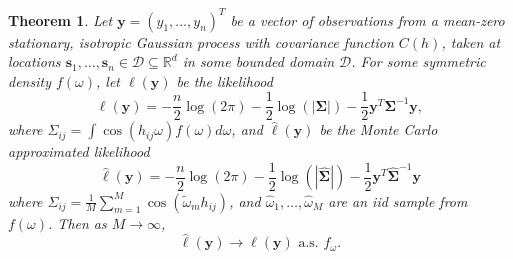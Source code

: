 \documentclass[12pt]{article}
\newtheorem{theorem}{Theorem}
\begin{document}
\begin{theorem}
  Let $\bm{y} = (y_1, \dots, y_n)^T$ be a vector of observations from a mean-zero stationary, isotropic Gaussian process with covariance function $C(h)$, taken at locations $\bm{s}_1, \dots, \bm{s}_n \in \mathcal{D} \subseteq \mathbb{R}^d$ in some bounded domain $\mathcal{D}$.  For some symmetric density $f(\omega)$, let $\ell(\bm{y})$ be the likelihood
  \[
    \ell(\bm{y}) = -\frac{n}{2} \log(2\pi) - \frac{1}{2} \log(|\bm{\Sigma}|) - \frac{1}{2} \bm{y}^T \bm{\Sigma}^{-1} \bm{y},
  \]
where $\Sigma_{ij} = \int \cos(h_{ij}\omega)f(\omega)d\omega$, and $\hat{\ell}(\bm{y})$ be the Monte Carlo approximated likelihood
    \[
    \hat{\ell}(\bm{y}) = -\frac{n}{2} \log(2\pi) - \frac{1}{2} \log (| \widehat{\bm{\Sigma}}|) - \frac{1}{2} \bm{y}^T \widehat{\bm{\Sigma}}^{-1} \bm{y}
  \] 
where $\widehat{\Sigma}_{ij} = \frac{1}{M} \sum_{m=1}^M \cos(\widetilde{\omega}_m h_{ij})$, and $\widehat{\omega}_1, \dots, \widehat{\omega}_M$ are an iid sample from $f(\omega)$.  Then as $M \to \infty$,
\[
\hat{\ell}(\bm{y}) \to \ell(\bm{y}) \text{ a.s. }f_\omega.
\]
\end{theorem}
\end{document}
